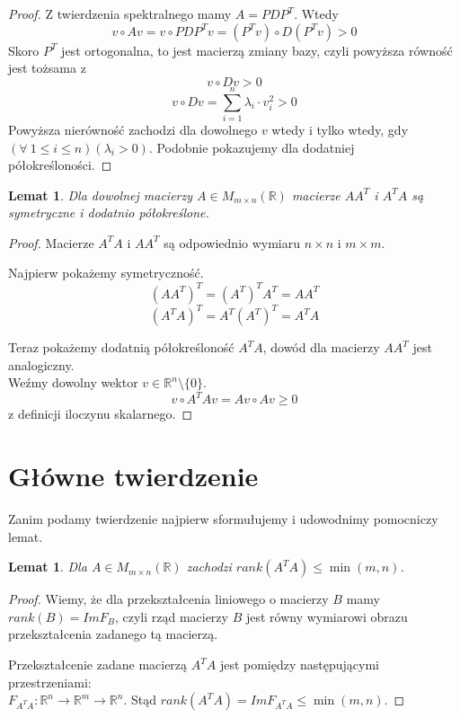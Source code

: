 \documentclass{article}
\newtheorem{lemma}[theorem]{Lemat}
\theoremstyle{definition}
\begin{document}
\begin{proof}
Z twierdzenia spektralnego mamy $A = PDP^T$. Wtedy 
$$ v \circ Av = v \circ PDP^Tv = (P^Tv) \circ D(P^Tv) > 0 $$
Skoro $P^T$ jest ortogonalna, to jest macierzą zmiany bazy, czyli powyższa równość jest tożsama z
$$ v \circ Dv > 0 $$
$$ v \circ Dv = \sum_{i = 1}^n \lambda_i \cdot v_i^2 > 0 $$
Powyższa nierówność zachodzi dla dowolnego $v$ wtedy i tylko wtedy, gdy $(\forall \: 1 \leq i \leq n) (\lambda_i > 0)$.
Podobnie pokazujemy dla dodatniej półokreśloności.
\end{proof}

\begin{lemma}
Dla dowolnej macierzy $A \in M_{m \times n} (\mathbb{R})$ macierze $AA^T$ i $A^TA$ są symetryczne i dodatnio półokreślone.
\end{lemma}
\begin{proof}
Macierze $A^TA$ i $AA^T$ są odpowiednio wymiaru $n \times n$ i $m \times m$.

Najpierw pokażemy symetryczność.
$$ (AA^T)^T = (A^T)^T  A^T = AA^T $$
$$ (A^TA)^T = A^T (A^T)^T = A^TA $$

Teraz pokażemy dodatnią półokreśloność $A^TA$, dowód dla macierzy $AA^T$ jest analogiczny. \\ Weźmy dowolny wektor $v \in \mathbb{R}^n \setminus \{ 0\}$.
$$ v \circ A^TA v = Av \circ Av \geq 0 $$
z definicji iloczynu skalarnego.
\end{proof}
\section{Główne twierdzenie}

Zanim podamy twierdzenie najpierw sformułujemy i udowodnimy pomocniczy lemat.
\begin{lemma}
Dla $A \in M_{m \times n} (\mathbb{R})$ zachodzi $rank(A^TA) \leq \min(m,n)$.
\end{lemma}
\begin{proof}
Wiemy, że dla przekształcenia liniowego o macierzy $B$ mamy $rank(B) = ImF_B$, czyli rząd macierzy $B$ jest równy wymiarowi obrazu przekształcenia zadanego tą macierzą.

Przekształcenie zadane macierzą $A^TA$ jest pomiędzy następującymi przestrzeniami: \\$F_{A^TA}: \mathbb{R}^n \rightarrow \mathbb{R}^m \rightarrow \mathbb{R}^n$. Stąd  $rank(A^TA) = Im F_{A^TA} \leq \min(m,n)$.
\end{proof}
\end{document}
